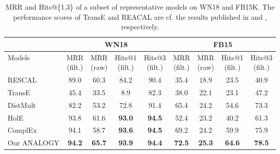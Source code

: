 \documentclass{article}
\begin{document}
\begin{table*}[t]
    \centering
    \caption{MRR and Hits@\{1,3\} of a subset of representative models on WN18 and FB15K. The performance scores of TransE and REACAL are cf. the results published in \cite{DBLP:conf/icml/TrouillonWRGB16} and \cite{DBLP:conf/aaai/NickelRP16}, respectively.}
    \begin{tabular}{@{}l|cccc|cccc@{}}
        \toprule
        & \multicolumn{4}{c}{WN18}                                      & \multicolumn{4}{c}{FB15}                                      \\ \midrule
        Models        & \pbox{1.0cm}{MRR \\ (filt.)}          & \pbox{1.0cm}{MRR \\ (raw)}      & \pbox{1.0cm}{Hits@1 \\ (filt.)}       & \pbox{1.0cm}{Hits@3 \\ (filt.)}       & \pbox{1.0cm}{MRR \\ (filt.)}          & \pbox{1.0cm}{MRR \\ (raw)}      & \pbox{1.0cm}{Hits@1 \\ (filt.)}        & \pbox{1.0cm}{Hits@3 \\ (filt.)}     \\ \midrule
        RESCAL  \cite{nickel2011three}      & 89.0          & 60.3          & 84.2          & 90.4          & 35.4          & 18.9          & 23.5          & 40.9          \\
        TransE   \cite{bordes2013translating}     & 45.4          & 33.5          & 8.9           & 82.3          & 38.0          & 22.1          & 23.1          & 47.2          \\ DistMult  \cite{DBLP:journals/corr/YangYHGD14a}    & 82.2          & 53.2          & 72.8          & 91.4          & 65.4          & 24.2          & 54.6          & 73.3          \\
        HolE  \cite{DBLP:conf/aaai/NickelRP16}        & 93.8          & 61.6          & \textbf{93.0}          & \textbf{94.5} & 52.4          & 23.2          & 40.2          & 61.3          \\ 
        ComplEx    \cite{DBLP:conf/icml/TrouillonWRGB16}   & 94.1          & 58.7          & \textbf{93.6}          & \textbf{94.5} & 69.2          & 24.2          & 59.9          & 75.9          \\
        \midrule
        Our ANALOGY & \textbf{94.2} & \textbf{65.7} & \textbf{93.9}          & \textbf{94.4}          & \textbf{72.5} & \textbf{25.3} & \textbf{64.6} & \textbf{78.5} \\ \bottomrule
    \end{tabular}
    \label{tab:results-representative}
\end{table*}
\end{document}
